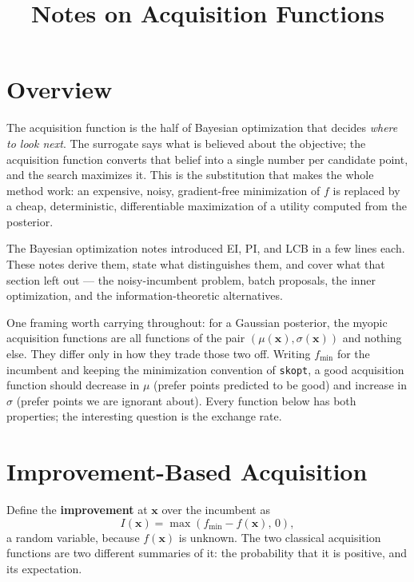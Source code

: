 \documentclass[conference]{IEEEtran}
\title{Notes on Acquisition Functions}
\author{
\IEEEauthorblockN{Luis Mendez}
}
\begin{document}
\maketitle

\section*{Overview}
The acquisition function is the half of Bayesian optimization that decides \textit{where to look next}. The surrogate says what is believed about the objective; the acquisition function converts that belief into a single number per candidate point, and the search maximizes it. This is the substitution that makes the whole method work: an expensive, noisy, gradient-free minimization of $f$ is replaced by a cheap, deterministic, differentiable maximization of a utility computed from the posterior.

The Bayesian optimization notes introduced EI, PI, and LCB in a few lines each. These notes derive them, state what distinguishes them, and cover what that section left out --- the noisy-incumbent problem, batch proposals, the inner optimization, and the information-theoretic alternatives.

One framing worth carrying throughout: for a Gaussian posterior, the myopic acquisition functions are all functions of the pair $(\mu(\mathbf{x}), \sigma(\mathbf{x}))$ and nothing else. They differ only in how they trade those two off. Writing $f_{\min}$ for the incumbent and keeping the minimization convention of \texttt{skopt}, a good acquisition function should decrease in $\mu$ (prefer points predicted to be good) and increase in $\sigma$ (prefer points we are ignorant about). Every function below has both properties; the interesting question is the exchange rate.

\section*{Improvement-Based Acquisition}
Define the \textbf{improvement} at $\mathbf{x}$ over the incumbent as
\begin{equation}
    I(\mathbf{x}) = \max\!\left(f_{\min} - f(\mathbf{x}),\, 0\right),
\end{equation}
a random variable, because $f(\mathbf{x})$ is unknown. The two classical acquisition functions are two different summaries of it: the probability that it is positive, and its expectation.
\end{document}
